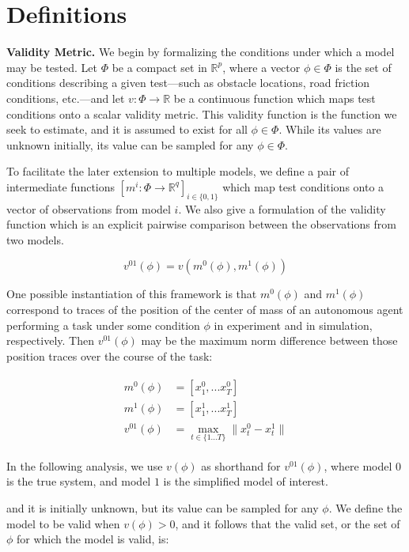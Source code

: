 \documentclass[12pt, conference]{IEEEtran}
\begin{document}
\section{Definitions}
\noindent\textbf{Validity Metric.} We begin by formalizing the conditions under which a model may be tested. Let $\Phi$ be a compact set in $\mathbb{R}^p$, where a vector $\phi\in\Phi$ is the set of conditions describing a given test---such as obstacle locations, road friction conditions, etc.---and let $v:\Phi\rightarrow\mathbb{R}$ be a continuous function which maps test conditions onto a scalar validity metric. This validity function is the function we seek to estimate, and it is assumed to exist for all $\phi\in\Phi$. While its values are unknown initially, its value can be sampled for any $\phi\in\Phi$.

To facilitate the later extension to multiple models, we define a pair of intermediate functions $[m^i:\Phi\rightarrow\mathbb{R}^q]_{i\in\{0,1\}}$ which map test conditions onto a vector of observations from model $i$. We also give a formulation of the validity function which is an explicit pairwise comparison between the observations from two models.

\begin{equation}
    v^{01}(\phi) = v(m^0(\phi), m^1(\phi))
    \label{eq:valorig}
\end{equation}
\smallskip

One possible instantiation of this framework is that $m^0(\phi)$ and $m^1(\phi)$ correspond to traces of the position of the center of mass of an autonomous agent performing a task under some condition $\phi$ in experiment and in simulation, respectively. Then $v^{01}(\phi)$ may be the maximum norm difference between those position traces over the course of the task:

\begin{align}
\begin{split}
    m^0(\phi)&=[x^0_1,...x^0_T] \\
    m^1(\phi)&=[x^1_1,...x^1_T] \\
    v^{01}(\phi) &= \max\limits_{t\in\{1...T\}} \|x^0_t-x^1_t\|
\end{split}
\end{align}
\smallskip

In the following analysis, we use $v(\phi)$ as shorthand for $v^{01}(\phi)$, where model $0$ is the true system, and model $1$ is the simplified model of interest.

and it is initially unknown, but its value can be sampled for any $\phi$. We define the model to be valid when $v(\phi)>0$, and it follows that the valid set, or the set of $\phi$ for which the model is valid, is:
\end{document}
